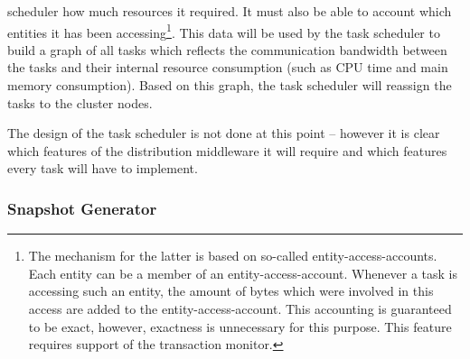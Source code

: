 \documentclass[a4paper, 10pt]{book}
\begin{document}
\begin{description}
                                        scheduler how much resources it required. It must also be able to
                                        account which entities it has been accessing\footnote{The mechanism
                                        for the latter is based on so-called entity-access-accounts. Each
                                        entity can be a member of an entity-access-account. Whenever a
                                        task is accessing such an entity, the amount of bytes which were
                                        involved in this access are added to the entity-access-account.
                                        This accounting is guaranteed to be exact, however, exactness is
                                        unnecessary for this purpose. This feature requires support of the
                                        transaction monitor.}. This data will be used by the task
                                        scheduler to build a graph of all tasks which reflects the
                                        communication bandwidth between the tasks and their internal
                                        resource consumption (such as CPU time and main memory consumption).
                                        Based on this graph, the task scheduler will reassign the tasks to
                                        the cluster nodes.
                                \end{description}
                                The design of the task scheduler is not done at this point -- however
                                it is clear which features of the distribution middleware it will
                                require and which features every task will have to implement.

                                \subsubsection{Snapshot Generator}
\end{document}
